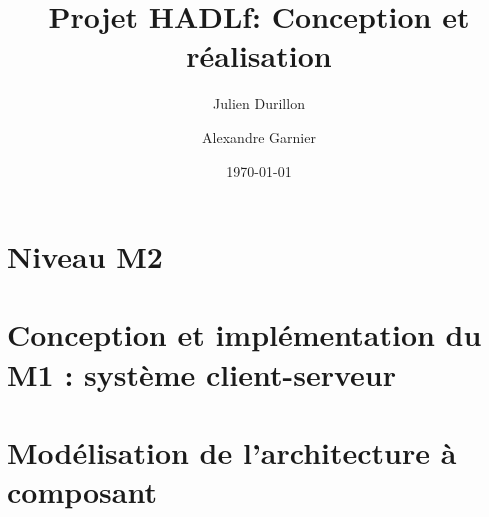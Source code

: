 \documentclass[a4paper]{article}
\title{Projet HADLf: Conception et réalisation}
\author{Julien Durillon \and Alexandre Garnier}
\date{\today}
\begin{document}
	\maketitle

	\tableofcontents\clearpage

	\section{Niveau M2}
	
	
	\section{Conception et implémentation du M1 : système client-serveur}
	
	
	
	\section{Modélisation de l'architecture à composant}
	
	
	
	
\end{document}
